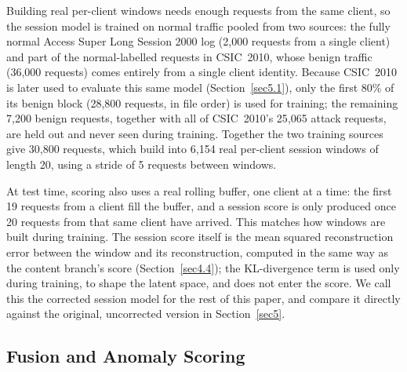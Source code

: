\documentclass[futureinternet,article,submit,moreauthors]{Definitions/mdpi}
\begin{document}
Building real per-client windows needs enough requests from the same client, so the session model is trained on normal traffic pooled from two sources: the fully normal Access Super Long Session 2000 log (2{,}000 requests from a single client) and part of the normal-labelled requests in CSIC~2010, whose benign traffic (36{,}000 requests) comes entirely from a single client identity. Because CSIC~2010 is later used to evaluate this same model (Section~\ref{sec5.1}), only the first 80\% of its benign block (28{,}800 requests, in file order) is used for training; the remaining 7{,}200 benign requests, together with all of CSIC~2010's 25{,}065 attack requests, are held out and never seen during training. Together the two training sources give 30{,}800 requests, which build into 6{,}154 real per-client session windows of length 20, using a stride of 5 requests between windows.

At test time, scoring also uses a real rolling buffer, one client at a time: the first 19 requests from a client fill the buffer, and a session score is only produced once 20 requests from that same client have arrived. This matches how windows are built during training. The session score itself is the mean squared reconstruction error between the window and its reconstruction, computed in the same way as the content branch's score (Section~\ref{sec4.4}); the KL-divergence term is used only during training, to shape the latent space, and does not enter the score. We call this the corrected session model for the rest of this paper, and compare it directly against the original, uncorrected version in Section~\ref{sec5}.

\subsection{Fusion and Anomaly Scoring} \label{sec4.6}
\end{document}
